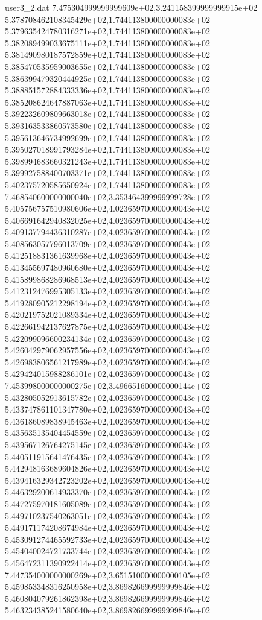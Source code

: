 \begin{filecontents}{user3_2.dat}
7.475304999999999609e+02,3.241158399999999915e+02
5.378708462108345429e+02,1.744113800000000083e+02
5.379635424780316271e+02,1.744113800000000083e+02
5.382089499033675111e+02,1.744113800000000083e+02
5.381490980187572859e+02,1.744113800000000083e+02
5.385470535959003655e+02,1.744113800000000083e+02
5.386399479320444925e+02,1.744113800000000083e+02
5.388851572884333336e+02,1.744113800000000083e+02
5.385208624647887063e+02,1.744113800000000083e+02
5.392232609809663018e+02,1.744113800000000083e+02
5.393163533860573580e+02,1.744113800000000083e+02
5.395613646734992699e+02,1.744113800000000083e+02
5.395027018991793284e+02,1.744113800000000083e+02
5.398994683660321243e+02,1.744113800000000083e+02
5.399927588400703371e+02,1.744113800000000083e+02
5.402375720585650924e+02,1.744113800000000083e+02
7.468540600000000040e+02,3.353464399999999728e+02
5.405756757510980606e+02,4.023659700000000043e+02
5.406691642940832025e+02,4.023659700000000043e+02
5.409137794436310287e+02,4.023659700000000043e+02
5.408563057796013709e+02,4.023659700000000043e+02
5.412518831361639968e+02,4.023659700000000043e+02
5.413455697480960680e+02,4.023659700000000043e+02
5.415899868286968513e+02,4.023659700000000043e+02
5.412312476995305133e+02,4.023659700000000043e+02
5.419280905212298194e+02,4.023659700000000043e+02
5.420219752021089334e+02,4.023659700000000043e+02
5.422661942137627875e+02,4.023659700000000043e+02
5.422099096600234134e+02,4.023659700000000043e+02
5.426042979062957556e+02,4.023659700000000043e+02
5.426983806561217989e+02,4.023659700000000043e+02
5.429424015988286101e+02,4.023659700000000043e+02
7.453998000000000275e+02,3.496651600000000144e+02
5.432805052913615782e+02,4.023659700000000043e+02
5.433747861101347780e+02,4.023659700000000043e+02
5.436186089838945463e+02,4.023659700000000043e+02
5.435635135404454559e+02,4.023659700000000043e+02
5.439567126764275145e+02,4.023659700000000043e+02
5.440511915641476435e+02,4.023659700000000043e+02
5.442948163689604826e+02,4.023659700000000043e+02
5.439416329342723202e+02,4.023659700000000043e+02
5.446329200614933370e+02,4.023659700000000043e+02
5.447275970181605089e+02,4.023659700000000043e+02
5.449710237540263051e+02,4.023659700000000043e+02
5.449171174208674984e+02,4.023659700000000043e+02
5.453091274465592733e+02,4.023659700000000043e+02
5.454040024721733744e+02,4.023659700000000043e+02
5.456472311390922414e+02,4.023659700000000043e+02
7.447354000000000269e+02,3.651510000000000105e+02
5.459853348316250958e+02,3.869826699999999846e+02
5.460804079261862398e+02,3.869826699999999846e+02
5.463234385241580640e+02,3.869826699999999846e+02

\end{filecontents}

